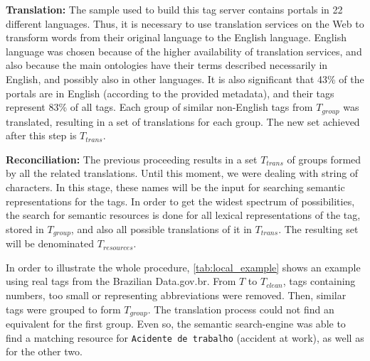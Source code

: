 \noindent \textbf{Translation:} The sample used to build this tag server contains portals in 22 different languages.
Thus, it is necessary to use translation services on the Web to transform words from their original language to the English language.
English language was chosen because of the higher availability of translation services, and also because the main ontologies have their terms described necessarily in English, and possibly also in other languages.
It is also significant that 43\% of the portals are in English (according to the provided metadata), and their tags represent 83\% of all tags.
Each group of similar non-English tags from $T_{group}$ was translated, resulting in a set of translations for each group.
The new set achieved after this step is $T_{trans}$.

\noindent \textbf{Reconciliation:} The previous proceeding results in a set $T_{trans}$ of groups formed by all the related translations.
Until this moment, we were dealing with string of characters.
In this stage, these names will be the input for searching semantic representations for the tags.
In order to get the widest spectrum of possibilities, the search for semantic resources is done for all lexical representations of the tag, stored in $T_{group}$, and also all possible translations of it in $T_{trans}$.
The resulting set will be denominated $T_{resources}$.


In order to illustrate the whole procedure, \autoref{tab:local_example} shows an example using real tags from the Brazilian Data.gov.br.
From $T$ to $T_{clean}$, tags containing numbers, too small or representing abbreviations were removed.
Then, similar tags were grouped to form $T_{group}$.
The translation process could not find an equivalent for the first group.
Even so, the semantic search-engine was able to find a matching resource for \texttt{Acidente de trabalho} (accident at work), as well as for the other two.

